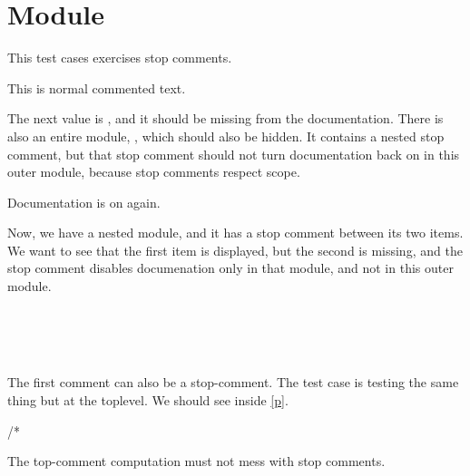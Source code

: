 \section{Module }\label{module-Stop}%
This test cases exercises stop comments.

\label{module-Stop-val-foo}\begin{ocamlindent}This is normal commented text.\end{ocamlindent}%
\medbreak
The next value is , and it should be missing from the documentation. There is also an entire module, , which should also be hidden. It contains a nested stop comment, but that stop comment should not turn documentation back on in this outer module, because stop comments respect scope.

Documentation is on again.

Now, we have a nested module, and it has a stop comment between its two items. We want to see that the first item is displayed, but the second is missing, and the stop comment disables documenation only in that module, and not in this outer module.

\label{module-Stop-module-N}\begin{ocamlindent}\label{module-Stop-module-N-val-quux}\\
\end{ocamlindent}%
\\
\label{module-Stop-val-lol}\\
The first comment can also be a stop-comment. The test case  is testing the same thing but at the toplevel. We should see  inside \hyperref[module-Stop-module-O]{[p\pageref*{module-Stop-module-O}]}.

\label{module-Stop-module-O}\begin{ocamlindent}\end{ocamlindent}%
\begin{ocamlindent}/*\end{ocamlindent}%
\medbreak
The top-comment computation must not mess with stop comments.

